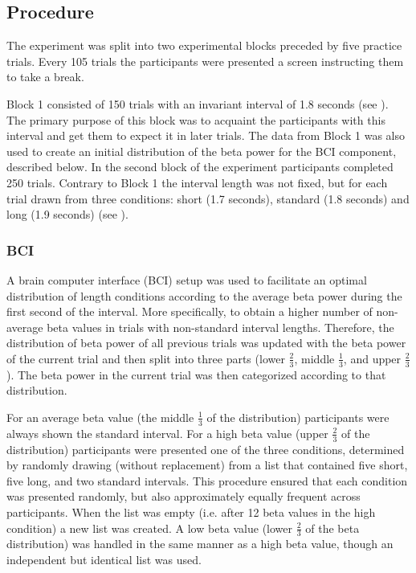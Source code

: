 \documentclass[man,floatsintext]{apa6} %
\begin{document}
\subsection{Procedure}
The experiment was split into two experimental blocks preceded by five practice trials. Every 105 trials the participants were presented a screen instructing them to take a break.

Block 1 consisted of 150 trials with an invariant interval of 1.8 seconds (see ). The primary purpose of this block was to acquaint the participants with this interval and get them to expect it in later trials. The data from Block 1 was also used to create an initial distribution of the beta power for the BCI component, described below.
In the second block of the experiment participants completed 250 trials. Contrary to Block 1 the interval length was not fixed, but for each trial drawn from three conditions: short (1.7 seconds), standard (1.8 seconds) and long (1.9 seconds) (see ).

\subsubsection{BCI}
A brain computer interface (BCI) setup was used to facilitate an optimal distribution of length conditions according to the average beta power during the first second of the interval. More specifically, to obtain a higher number of non-average beta values in trials with non-standard interval lengths. Therefore, the distribution of beta power of all previous trials was updated with the beta power of the current trial and then split into three parts (lower $\frac{2}{3}$, middle $\frac{1}{3}$, and upper $\frac{2}{3}$). The beta power in the current trial was then categorized according to that distribution.

For an average beta value (the middle $\frac{1}{3}$ of the distribution) participants were always shown the standard interval. For a high beta value (upper $\frac{2}{3}$ of the distribution) participants were presented one of the three conditions, determined by randomly drawing (without replacement) from a list that contained five short, five long, and two standard intervals. This procedure ensured that each condition was presented randomly, but also approximately equally frequent across participants. When the list was empty (i.e. after 12 beta values in the high condition) a new list was created. A low beta value (lower $\frac{2}{3}$ of the beta distribution) was handled in the same manner as a high beta value, though an independent but identical list was used.
\end{document}

